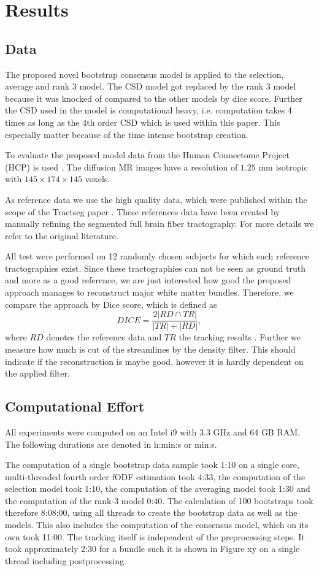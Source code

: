 \section{Results}
\subsection{Data}
The proposed novel bootstrap consensus model is applied to the selection,
average and rank $3$ model. The CSD model got replaced by the rank $3$ model
because it was knocked of compared to the other models by dice score. Further
the CSD used in the model is computational heavy, i.e. computation takes 4 times as long
as the $4$th order CSD which is used within this paper. This especially matter
because of the time intense bootstrap creation. 

To evaluate the proposed model data from the Human
Connectome Project (HCP) is used \cite{HCP}. The diffusion MR images have a resolution of $1.25$ mm
isotropic with $145 \times 174 \times 145$ voxels. 

As reference data we use the high quality data, which were published within the
scope of the Tractseg paper \cite{WASSERTHAL2018239}. These references data have been
created by manually refining the segmented full brain fiber tractography. For
more details we refer to the original literature.

All test were performed on 12 randomly chosen subjects for which such reference tractographies
exist. Since these tractographies can not be seen as ground truth and more as a
good reference, we are just interested how good the proposed approach manages to
reconstruct major white matter bundles. Therefore, we compare the approach by
Dice score, which is defined as
\[ 
	DICE = \frac{2 |RD \cap TR |}{|TR| + |RD|} ,
\]
where $RD$ denotes the reference data and $TR$ the tracking results
\cite{SCHILLING2019194}. 
Further we measure how much is cut of the streamlines by the density filter.
This should indicate if the reconstruction is maybe good, however it is hardly
dependent on the applied filter. 

\subsection{Computational Effort}
All experiments were computed on an Intel i9 with 3.3 GHz and 64 GB RAM. The
following durations are denoted in h:min:s or min:s.

The computation of a single bootstrap data sample took 1:10 on a single core,
multi-threaded fourth order fODF estimation took 4:33, the computation of the
selection model took 1:10, the computation of the averaging model took 1:30 and
the computation of the rank-3 model 0:40. The calculation of 100 bootstraps took
therefore 8:08:00, using all threads to create the bootstrap data as well as the
models. This also includes the computation of the consensus model, which on its
own took 11:00. The tracking itself is independent of the preprocessing steps.
It took approximately 2:30 for a bundle such it is shown in Figure xy on a
single thread including postprocessing.  
